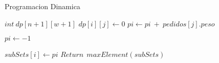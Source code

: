 \begin{algorithm}
\caption{Programacion Dinamica}\label{selection}
\begin{algorithmic}[1]
	\State $int \ dp[n+1][w+1]$
    	\State $dp[i][j] \gets 0$
	\State $pi \gets pi\ +\ pedidos[j].peso$
	\EndIf
	\EndFor

	\State $pi \gets -1$
	\EndIf

	\State $subSets[i] \gets pi $
    \EndFor
   	\State $Return \ \ maxElement(subSets)$
\EndProcedure
\end{algorithmic}
\end{algorithm}

